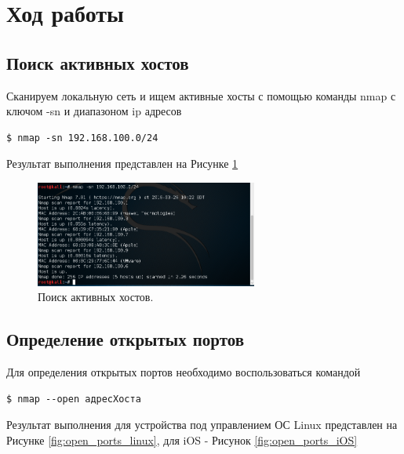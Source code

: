 \documentclass[10pt,a4paper]{article}
\begin{document}

\section{Ход работы}

\subsection{Поиск активных хостов}
\label{find_active_hosts}

Сканируем локальную сеть и ищем активные хосты с помощью команды nmap с ключом -sn и диапазоном ip адресов
\begin{verbatim}
$ nmap -sn 192.168.100.0/24
\end{verbatim}

Результат выполнения представлен на Рисунке \ref{fig:find_hosts}

\begin{figure}[h]
\begin{center}
\includegraphics[width=0.65\textwidth]{find_hosts}
\caption{Поиск активных хостов.}
\label{fig:find_hosts}
\end{center}
\end{figure}

\subsection{Определение открытых портов}
\label{open_ports}

Для определения открытых портов необходимо воспользоваться командой
\begin{verbatim}
$ nmap --open адресХоста
\end{verbatim}

Результат выполнения для устройства под управлением ОС Linux представлен на Рисунке \ref{fig:open_ports_linux}, для iOS - Рисунок  \ref{fig:open_ports_iOS}
\end{document}
